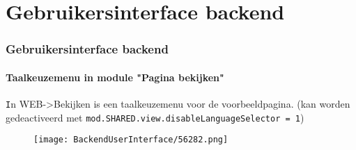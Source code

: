 %

\section{Gebruikersinterface backend}

\begin{frame}[fragile]
	\frametitle{Gebruikersinterface backend}
	\framesubtitle{Taalkeuzemenu in module "Pagina bekijken"}


	\texttt In {WEB->Bekijken} is een taalkeuzemenu voor de voorbeeldpagina.\newline
	\smaller
		(kan worden gedeactiveerd met \texttt{mod.SHARED.view.disableLanguageSelector = 1})
	\normalsize

	\begin{figure}
		\texttt{[image: BackendUserInterface/56282.png]}
	\end{figure}

\end{frame}

